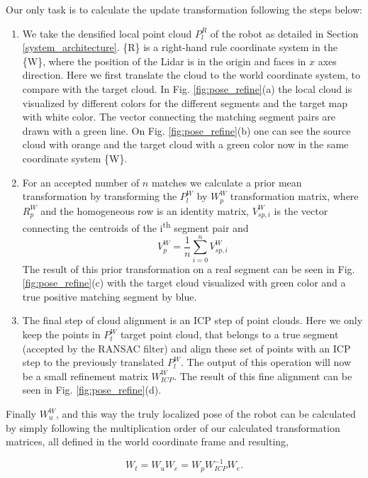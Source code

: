 \documentclass[letterpaper, 10 pt, conference]{ieeeconf}  %
\begin{document}
Our only task is to calculate the update transformation following the steps below:
\begin{enumerate}
    \item We take the densified local point cloud $P_l^R$ of the robot as detailed in Section \ref{system_architecture}. \{R\} is a right-hand rule coordinate system in the \{W\}, where the position of the Lidar is in the origin and faces in $x$ axes direction. Here we first translate the cloud to the world coordinate system, to compare with the target cloud. In Fig. \ref{fig:pose_refine}(a) the local cloud is visualized by different colors for the different segments and the target map with white color. The vector connecting the matching segment pairs are drawn with a green line. On Fig. \ref{fig:pose_refine}(b) one can see the source cloud with orange and the target cloud with a green color now in the same coordinate system \{W\}. 
    \item For an accepted number of $n$ matches we calculate a prior mean transformation by transforming the $P_l^W$ by $W_p^W$ transformation matrix, where $R_p^W$ and the homogeneous row is an identity matrix, $V_{sp,i}^W$ is the vector connecting the centroids of the i\textsuperscript{th} segment pair and
    \begin{equation}
        V_p^W=\frac{1}{n}\sum_{i=0}^n V_{sp,i}^W
    \end{equation}
    The result of this prior transformation on a real segment can be seen in Fig. \ref{fig:pose_refine}(c) with the target cloud visualized with green color and a true positive matching segment by blue. 
    \item The final step of cloud alignment is an ICP step of point clouds. Here we only keep the points in $P_t^W$ target point cloud, that belongs to a true segment (accepted by the RANSAC filter) and align these set of points with an ICP step to the previously translated $P_l^W$. The output of this operation will now be a small refinement matrix $W_{ICP}^W$. The result of this fine alignment can be seen in Fig. \ref{fig:pose_refine}(d). 
\end{enumerate}

Finally $W_u^W$, and this way the truly localized pose of the robot can be calculated by simply following the multiplication order of our calculated transformation matrices, all defined in the world coordinate frame and resulting,

\begin{equation}
    W_t=W_u  W_e =  W_p W_{ICP}^{-1} W_e.
\end{equation}
\end{document}
